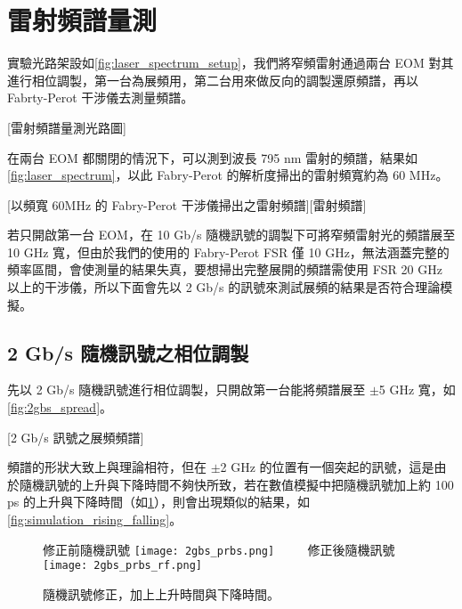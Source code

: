 \documentclass[class=NCU_thesis, crop=false]{standalone}
\begin{document}
\section{雷射頻譜量測}

實驗光路架設如\cref{fig:laser_spectrum_setup}，我們將窄頻雷射通過兩台 EOM 對其進行相位調製，第一台為展頻用，第二台用來做反向的調製還原頻譜，再以 Fabrty-Perot 干涉儀去測量頻譜。

[雷射頻譜量測光路圖]

在兩台 EOM 都關閉的情況下，可以測到波長 795 nm 雷射的頻譜，結果如\cref{fig:laser_spectrum}，以此 Fabry-Perot 的解析度掃出的雷射頻寬約為 60 MHz。

[以頻寬 60MHz 的 Fabry-Perot 干涉儀掃出之雷射頻譜][雷射頻譜]


若只開啟第一台 EOM，在 10 Gb/s 隨機訊號的調製下可將窄頻雷射光的頻譜展至 10 GHz 寬，但由於我們的使用的 Fabry-Perot FSR 僅 10 GHz，無法涵蓋完整的頻率區間，會使測量的結果失真，要想掃出完整展開的頻譜需使用 FSR 20 GHz 以上的干涉儀，所以下面會先以 2 Gb/s 的訊號來測試展頻的結果是否符合理論模擬。

\subsection{2 Gb/s 隨機訊號之相位調製}
先以 2 Gb/s 隨機訊號進行相位調製，只開啟第一台能將頻譜展至 $\pm$5 GHz 寬，如\cref{fig:2gbs_spread}。

[2 Gb/s 訊號之展頻頻譜]

頻譜的形狀大致上與理論相符，但在 $\pm$2 GHz 的位置有一個突起的訊號，這是由於隨機訊號的上升與下降時間不夠快所致，若在數值模擬中把隨機訊號加上約 100 ps 的上升與下降時間（如\cref{fig:simulation_rising_falling_prbs}），則會出現類似的結果，如\cref{fig:simulation_rising_falling}。

\begin{figure}[!hbt]
    \centering
    \subcaptionbox
        {修正前隨機訊號
        \label{fig:subfig_fig1}}
        {\texttt{[image: 2gbs\_prbs.png]}}
    ~~~~
    \subcaptionbox
        {修正後隨機訊號
        \label{fig:subfig_fig2}}
        {\texttt{[image: 2gbs\_prbs\_rf.png]}}
    \caption{隨機訊號修正，加上上升時間與下降時間。}
    \label{fig:simulation_rising_falling_prbs}
\end{figure}
\end{document}
